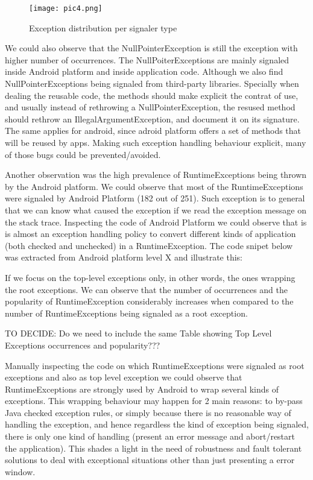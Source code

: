 \documentclass[conference]{IEEEtran}
\begin{document}
\begin{figure}
\centering
\texttt{[image: pic4.png]}
\caption{Exception distribution per signaler type}
\label{fig:androidsignaler}
\end{figure}

We could also observe that the NullPointerException is still the exception with higher number of occurrences. The NullPoiterExceptions are mainly signaled inside Android platform and inside application code. Although we also find NullPointerExceptions being signaled from third-party libraries. Specially when dealing the reusable code, the methods should make explicit the contrat of use, and usually instead of rethrowing a NullPointerException, the resused method should rethrow an IllegalArgumentException, and document it on its signature. The same applies for android, since adroid platform offers a set of methods that will be reused by apps. Making such exception handling behaviour explicit, many of those bugs could be prevented/avoided.

Another observation was the high prevalence of RuntimeExceptions being thrown by the Android platform. We could observe that most of the RuntimeExceptions were signaled by Android Platform (182 out of 251). Such exception is to general that we can know what caused the exception if we read the exception message on the stack trace. Inspecting the code of Android Platform we could observe that is is almost an exception handling policy to convert different kinds of application (both checked and unchecked) in a RuntimeException. The code snipet below was extracted from Android platform level X and illustrate this:

If we focus on the top-level exceptions only, in other words, the ones wrapping the root exceptions. We can observe that the number of occurrences and the popularity of RuntimeException considerably increases when compared to the number of RuntimeExceptions being signaled as a root exception. 

TO DECIDE: Do we need to include the same Table showing Top Level Exceptions occurrences and popularity???

Manually inspecting the code on which RuntimeExceptions  were signaled as root exceptions and also as top level exception we could observe that RuntimeExceptions are strongly used by Android to wrap several kinds of exceptions. This wrapping behaviour may happen for 2 main reasons:  to by-pass Java checked exception rules, or simply because there is no reasonable way of handling the exception, and hence regardless the kind of exception being signaled, there is only one kind of handling (present an error message and abort/restart the application). This  shades a light in the need of robustness and fault tolerant solutions to deal with exceptional situations other than just presenting a error window.
\end{document}
